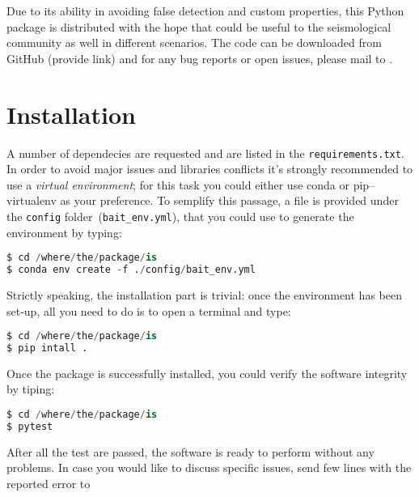 \documentclass[11pt,a4paper,twocolumns]{article}
\begin{document}
Due to its ability in avoiding false detection and custom properties, this Python package is distributed with the hope that could be useful to the seismological community as well in different scenarios. The code can be downloaded from GitHub (provide link) and for any bug reports or open issues, please mail to \mymail.



\section{Installation}
A number of dependecies are requested and are listed in the \texttt{requirements.txt}. In order to avoid major issues and libraries conflicts it's strongly recommended to use a \emph{virtual environment}; for this task you could either use conda or pip--virtualenv as your preference.
To semplify this passage, a file is provided under the \texttt{config} folder~(\texttt{bait\_env.yml}), that you could use to generate the environment by typing:
\begin{lstlisting}[language=Python]
$ cd /where/the/package/is
$ conda env create -f ./config/bait_env.yml
\end{lstlisting}

Strictly speaking, the installation part is trivial: once the environment has been set-up, all you need to do is to open a terminal and type:
\begin{lstlisting}[language=Python]
$ cd /where/the/package/is
$ pip intall .
\end{lstlisting}

Once the package is successfully installed, you could verify the software integrity by tiping:
\begin{lstlisting}[language=Python]
$ cd /where/the/package/is
$ pytest
\end{lstlisting}

After all the test are passed, the software is ready to perform without any problems.
In case you would like to discuss specific issues, send few lines with the reported error to \mymail
\end{document}
